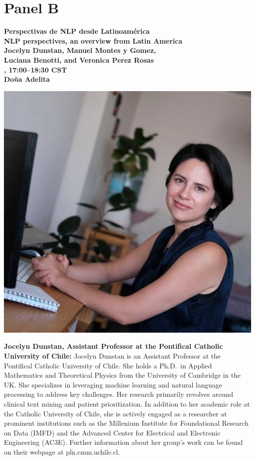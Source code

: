 \newpage
{}
\section{Panel B}

\begin{center}
{\bfseries\Large Perspectivas de NLP desde Latinoam\'erica\\\vspace{2.0\lineskip}NLP perspectives, an overview from Latin America } \\
\vspace{1.0em}
{\large\bf Jocelyn Dunstan, Manuel Montes y Gomez,\\\vspace{2.0\lineskip}Luciana Benotti, and Veronica Perez Rosas } \\

\textbf{\daydateyear{}, 17:00--18:30 CST}\\
\textbf{Do\~na Adelita}
\end{center}


\vspace{1em}
\begin{center}
\includegraphics[width=0.3\linewidth]{content/mexican_nlp/jocelyn.jpeg}
\end{center}
{\bfseries Jocelyn Dunstan, Assistant Professor at the Pontifical Catholic University of Chile:}
Jocelyn Dunstan is an Assistant Professor at the Pontifical Catholic University of Chile. She holds a Ph.D.~in Applied Mathematics and Theoretical Physics from the University of Cambridge in the UK. She specializes in leveraging machine learning and natural language processing to address key challenges. Her research primarily revolves around clinical text mining and patient prioritization. In addition to her academic role at the Catholic University of Chile, she is actively engaged as a researcher at prominent institutions such as the Millenium Institute for Foundational Research on Data (IMFD) and the Advanced Center for Electrical and Electronic Engineering (AC3E). Further information about her group's work can be found on their webpage at pln.cmm.uchile.cl.

